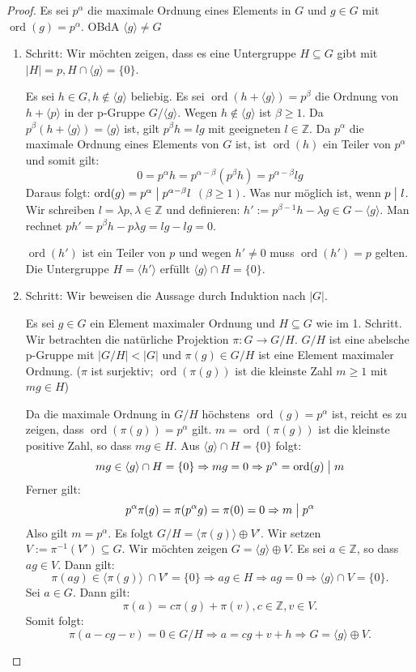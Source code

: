 \documentclass[12pt]{scrartcl} %
\DeclareMathOperator{\ord}{ord}
\newcommand{\divides}{\mathrel{\bigm|}}
\theoremstyle{definition}
\theoremstyle{remark}
\begin{document}
\begin{proof}
Es sei $p^{\alpha}$ die maximale Ordnung eines Elements in $G$ und $g\in G$ mit $\ord(g)=p^{\alpha}$. OBdA $\langle g\rangle \neq G$ 
\begin{enumerate}
\item Schritt: Wir möchten zeigen, dass es eine Untergruppe $H\subseteq G$ gibt mit $|H|=p, H\cap \langle g\rangle =\{ 0\}$.

Es sei $h \in G,h\notin \langle g \rangle$ beliebig.
Es sei $\ord(h+\langle g\rangle)=p^{\beta}$ die Ordnung von $h+\langle p\rangle$ in der p-Gruppe $G/\langle g\rangle$.
Wegen $h\notin \langle g\rangle$ ist $\beta\geq1$. 
Da $p^{\beta}(h+\langle g\rangle)=\langle g\rangle$ ist, gilt $p^{\beta}h=lg$ mit geeigneten $l\in \mathbb{Z}$. 
Da $p^{\alpha}$ die maximale Ordnung eines Elements von $G$ ist, ist $\ord(h)$ ein Teiler von $p^{\alpha}$ und somit gilt:
\[ 0=p^{\alpha}h=p^{\alpha -\beta}(p^{\beta}h)=p^{\alpha -\beta}lg\]
Daraus folgt: $ \ord(g)=p^{\alpha} \divides p^{\alpha -\beta}l$ $(\beta \geq 1)$. 
Was nur möglich ist, wenn $p \divides l$. 
Wir schreiben $l=\lambda p, \lambda \in \mathbb{Z}$ und definieren: $h':=p^{\beta -1}h-\lambda g \in G - \langle g \rangle.$ Man rechnet $ ph' = p^{\beta}h - p \lambda g =lg-lg=0$.

$\ord(h')$ ist ein Teiler von $p$ und wegen $h'\neq 0$ muss $\ord(h')=p$ gelten. 
Die Untergruppe $H=\langle h'\rangle$ erfüllt $\langle g\rangle \cap H=\{ 0\}$.
\item Schritt: Wir beweisen die Aussage durch Induktion nach $|G|$.

Es sei $g\in G$ ein Element maximaler Ordnung und $H\subseteq G$ wie im 1. Schritt. 
Wir betrachten die natürliche Projektion $\pi :G\rightarrow G/H$. 
$G/H$ ist eine abelsche p-Gruppe mit $|G/H|<|G|$ und $\pi (g)\in G/H$ ist eine Element maximaler Ordnung.
($\pi$ ist surjektiv; $\ord(\pi (g))$ ist die kleinste Zahl $m\geq 1$ mit $mg\in H$)

Da die maximale Ordnung in $G/H$ höchstens $\ord(g)=p^{\alpha}$ ist, reicht es zu zeigen, dass $\ord(\pi (g))=p^{\alpha}$ gilt.
$m=\ord(\pi (g))$ ist die kleinste positive Zahl, so dass $mg\in H$. Aus $\langle g\rangle \cap H=\{ 0\}$ folgt:
\[ mg\in \langle g\rangle \cap H=\{ 0\} \Rightarrow mg=0 \Rightarrow p^{\alpha}=\ord(g) \divides m\]
Ferner gilt:
\[ p^{\alpha}\pi (g)=\pi (p^{\alpha}g)=\pi(0) =0\Rightarrow m \divides p^{\alpha}\]
Also gilt $m=p^{\alpha}$. Es folgt $G/H=\langle \pi (g)\rangle \oplus V'$. 
Wir setzen $V := \pi ^{-1}(V') \subseteq G$. Wir möchten zeigen $G=\langle g\rangle \oplus V$. Es sei $a\in \mathbb{Z}$, so dass $ag\in V$. Dann gilt:
\[ \pi (ag)\in \langle \pi (g)\rangle\ \cap V'=\{ 0\}\Rightarrow ag\in H\Rightarrow ag=0\Rightarrow \langle g\rangle \cap V=\{ 0\}.\]
Sei $a\in G$. Dann gilt:
\[ \pi (a)=c\pi (g)+\pi (v),c\in \mathbb{Z}, v\in V.\]
Somit folgt:
\[ \pi (a-cg-v )=0\in G/H\Rightarrow a=cg+v+h\Rightarrow G = \langle g\rangle \oplus V.\]
\qedhere
\end{enumerate} 
\end{proof}
\end{document}
